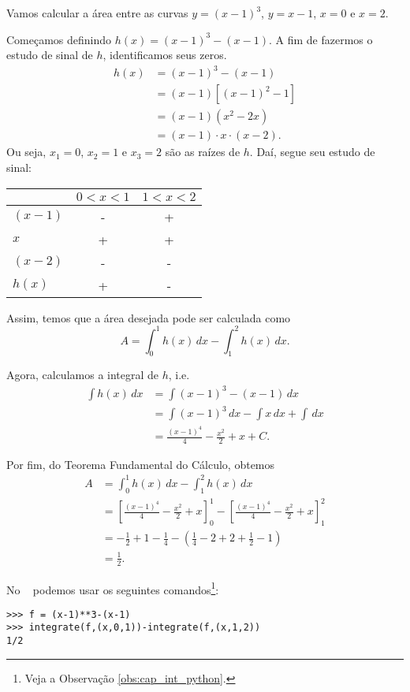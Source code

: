 \begin{ex}
  Vamos calcular a área entre as curvas $y = (x-1)^3$, $y = x-1$, $x=0$ e $x=2$.

  Começamos definindo $h(x) = (x-1)^3 - (x-1)$. A fim de fazermos o estudo de sinal de $h$, identificamos seus zeros.
  \begin{align}
    h(x) &= (x-1)^3-(x-1) \\
         &= (x-1)\left[(x-1)^2-1\right] \\
         &= (x-1)(x^2-2x) \\
         &= (x-1)\cdot x\cdot (x-2).
  \end{align}
  Ou seja, $x_1=0$, $x_2=1$ e $x_3=2$ são as raízes de $h$. Daí, segue seu estudo de sinal:
  \begin{center}
    \begin{tabular}{l|c|c}
              & $0<x<1$ & $1<x<2$ \\\hline
      $(x-1)$ &   -     &    +    \\
      $x$     &   +     &    +    \\
      $(x-2)$ &   -     &    -    \\\hline
      $h(x)$  &   +     &    -    \\\hline
    \end{tabular}
  \end{center}
  Assim, temos que a área desejada pode ser calculada como
  \begin{equation}
    A = \int_0^1 h(x)\,dx - \int_1^2 h(x)\,dx.
  \end{equation}

  Agora, calculamos a integral de $h$, i.e.
  \begin{align}
    \int h(x)\,dx &= \int (x-1)^3-(x-1)\,dx \\
                  &= \int (x-1)^3\,dx - \int x\,dx + \int\,dx \\
                  &= \frac{(x-1)^4}{4} - \frac{x^2}{2} + x + C.
  \end{align}

  Por fim, do Teorema Fundamental do Cálculo, obtemos
  \begin{align}
    A &= \int_0^1 h(x)\,dx - \int_1^2 h(x)\,dx \\
      &= \left[\frac{(x-1)^4}{4} - \frac{x^2}{2} + x\right]_0^1 - \left[\frac{(x-1)^4}{4} - \frac{x^2}{2} + x\right]_1^2 \\
      &= -\frac{1}{2}+1-\frac{1}{4}-\left(\frac{1}{4}-2+2+\frac{1}{2}-1\right) \\
      &= \frac{1}{2}.
  \end{align}
  
  \ifispython
  No \sympy~ podemos usar os seguintes comandos\footnote{Veja a Observação \ref{obs:cap_int_python}.}:
\begin{verbatim}
>>> f = (x-1)**3-(x-1)
>>> integrate(f,(x,0,1))-integrate(f,(x,1,2))
1/2
\end{verbatim}
\fi  
\end{ex}

